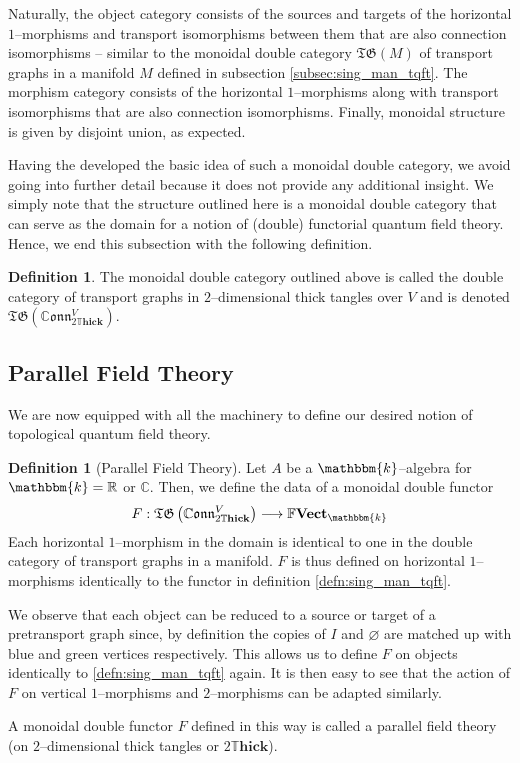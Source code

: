 \documentclass{amsart}
\newcommand{\R}{\mathbb{R}}
\newcommand{\C}{\mathbb{C}}
\newcommand{\K}{\mathbbm{k}}
\renewcommand{\to}[1][]{\stackrel{#1}{\longrightarrow}}
\newcommand{\br}[1]{\left( #1 \right)}
\newcommand{\FFVect}{\mathbb{F}\textbf{Vect}}
\newcommand{\DThick}{2\mathbb{T}\mathbf{hick}}
\newcommand{\TG}{\mathfrak{TG}}
\newcommand{\CConn}{\mathbb{C}\mathfrak{onn}}
\numberwithin{thm}{section}
\theoremstyle{definition}
\newtheorem{defn}[thm]{Definition}
\begin{document}
Naturally, the object category consists of the sources and targets of the
horizontal $1$--morphisms and transport isomorphisms between them that are also
connection isomorphisms -- similar to the monoidal double category $\TG(M)$ of
transport graphs in a manifold $M$ defined in subsection
\ref{subsec:sing_man_tqft}. The morphism category consists of the horizontal
$1$--morphisms along with transport isomorphisms that are also connection
isomorphisms. Finally, monoidal structure is given by disjoint union, as
expected.

Having the developed the basic idea of such a monoidal double category, we avoid
going into further detail because it does not provide any additional insight. We
simply note that the structure outlined here is a monoidal double category that
can serve as the domain for a notion of (double) functorial quantum field
theory. Hence, we end this subsection with the following definition.

\begin{defn}
The monoidal double category outlined above is called the double category of
transport graphs in $2$--dimensional thick tangles over $V$ and is
denoted $\TG\br{\CConn^V_{\DThick}}$.
\end{defn}


%

\subsection{Parallel Field Theory}

We are now equipped with all the machinery to define our desired notion of
topological quantum field theory.

\begin{defn}[Parallel Field Theory]
Let $A$ be a $\K$--algebra for $\K = \R$ or $\C$. Then, we define the data of a
monoidal double functor
\[
  F : \TG\br{\CConn^V_{\DThick}} \to \FFVect_{\K}
\]
Each horizontal $1$--morphism in the domain is identical to one in the
double category of transport graphs in a manifold. $F$ is thus defined on
horizontal $1$--morphisms identically to the functor in definition
\ref{defn:sing_man_tqft}.

We observe that each object can be reduced to a source or target of a
pretransport graph since, by definition the copies of $I$ and $\varnothing$ are
matched up with blue and green vertices respectively. This allows us to define
$F$ on objects identically to \ref{defn:sing_man_tqft} again. It is then easy to
see that the action of $F$ on vertical $1$--morphisms and $2$--morphisms can be
adapted similarly.

A monoidal double functor $F$ defined in this way is called a parallel field
theory (on $2$--dimensional thick tangles or $\DThick$).
\end{defn}
\end{document}
